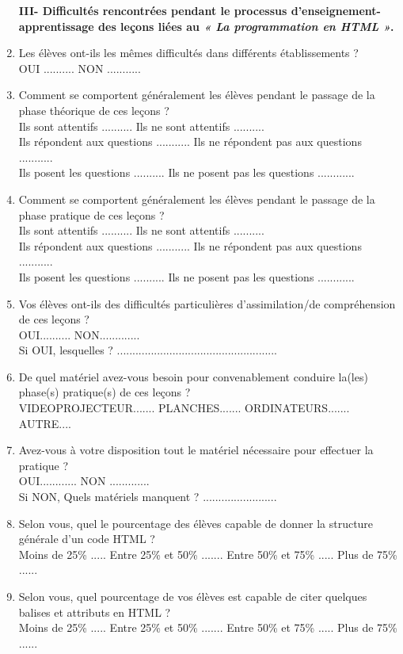 \begin{enumerate}
\textbf{III- Difficultés rencontrées pendant le processus d'enseignement-apprentissage des leçons liées au \emph{« La programmation en HTML »}.}\\

\item Les élèves ont-ils les mêmes difficultés dans différents établissements ?\\
 OUI ..........  NON ...........
\item Comment se comportent généralement les élèves pendant le passage de la phase théorique de ces leçons ?\\
Ils sont attentifs ..........			Ils ne sont attentifs ..........\\
Ils répondent aux questions ...........	Ils ne répondent pas aux questions ...........\\
Ils posent les questions ..........	Ils ne posent pas les questions ............
 \item Comment se comportent généralement les élèves pendant le passage de la phase pratique de ces leçons ?\\
Ils sont attentifs ..........			Ils ne sont attentifs ..........\\
Ils répondent aux questions ...........	Ils ne répondent pas aux questions ...........\\
Ils posent les questions ..........	Ils ne posent pas les questions ............
\item Vos élèves ont-ils des difficultés particulières d'assimilation/de compréhension de ces leçons ?\\
OUI..........  			NON.............\\
Si OUI, lesquelles ? ....................................................
\item De quel matériel avez-vous besoin pour convenablement conduire la(les) phase(s) pratique(s) de ces leçons ?\\
VIDEOPROJECTEUR.......      PLANCHES.......    ORDINATEURS.......  AUTRE....
\item Avez-vous à votre disposition tout le matériel nécessaire pour effectuer la pratique ?\\
OUI............ 	NON .............\\
Si NON, Quels matériels manquent ? ........................
\item Selon vous, quel le pourcentage des élèves capable de donner la structure générale d'un code HTML ?\\
Moins de 25\% ..... Entre 25\% et 50\% ....... 	Entre 50\% et 75\% ..... Plus de 75\% ......
\item Selon vous, quel pourcentage de vos élèves est capable de citer quelques balises et attributs en HTML ?\\
Moins de 25\% ..... Entre 25\% et 50\% ....... 	Entre 50\% et 75\% ..... Plus de 75\% ......\\


\end{enumerate}

